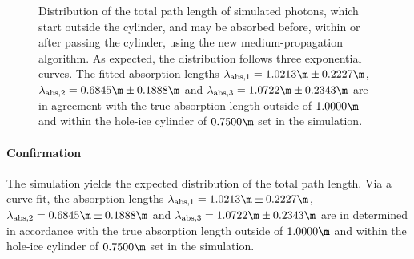 \begin{figure}
  \caption{Distribution of the total path length of simulated photons, which start outside the cylinder, and may be absorbed before, within or after passing the cylinder, using the new medium-propagation algorithm. As expected, the distribution follows three exponential curves. The fitted absorption lengths $\lambda_\text{abs,1} = 1.0213\m \pm 0.2227\m$, $\lambda_\text{abs,2} = 0.6845\m \pm 0.1888\m$ and $\lambda_\text{abs,3} = 1.0722\m \pm 0.2343\m$ are in agreement with the true absorption length outside of $1.0000\m$ and within the hole-ice cylinder of $0.7500\m$ set in the simulation.}
\end{figure}


\paragraph{Confirmation} The simulation yields the expected distribution of the total path length. Via a curve fit, the absorption lengths $\lambda_\text{abs,1} = 1.0213\m \pm 0.2227\m$, $\lambda_\text{abs,2} = 0.6845\m \pm 0.1888\m$ and $\lambda_\text{abs,3} = 1.0722\m \pm 0.2343\m$ are in determined in accordance with the true absorption length outside of $1.0000\m$ and within the hole-ice cylinder of $0.7500\m$ set in the simulation.